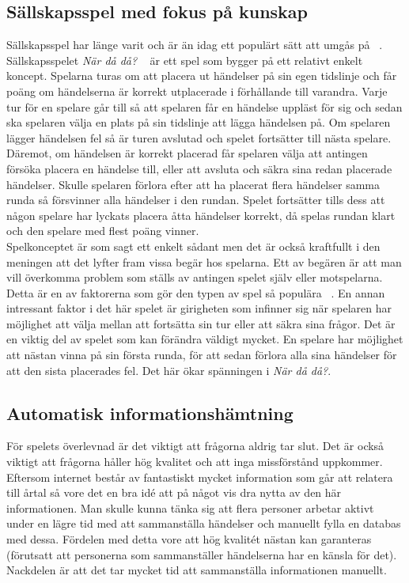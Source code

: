 \documentclass[a4paper, 11pt]{article}
\begin{document}
\subsection{Sällskapsspel med fokus på kunskap}
Sällskapsspel har länge varit och är än idag ett populärt sätt att umgås på ~\cite{bradspelspop}. Sällskapsspelet \textit{När då då?} ~\cite{nardada} är ett spel som bygger på ett relativt enkelt koncept. Spelarna turas om att placera ut händelser på sin egen tidslinje och får poäng om händelserna är korrekt utplacerade i förhållande till varandra. Varje tur för en spelare går till så att spelaren får en händelse uppläst för sig och sedan ska spelaren välja en plats på sin tidslinje att lägga händelsen på. Om spelaren lägger händelsen fel så är turen avslutad och spelet fortsätter till nästa spelare. Däremot, om händelsen är korrekt placerad får spelaren välja att antingen försöka placera en händelse till, eller att avsluta och säkra sina redan placerade händelser. Skulle spelaren förlora efter att ha placerat flera händelser samma runda så försvinner alla händelser i den rundan. Spelet fortsätter tills dess att någon spelare har lyckats placera åtta händelser korrekt, då spelas rundan klart och den spelare med flest poäng vinner.\\

Spelkonceptet är som sagt ett enkelt sådant men det är också kraftfullt i den meningen att det lyfter fram vissa begär hos spelarna. Ett av begären är att man vill överkomma problem som ställs av antingen spelet själv eller motspelarna. Detta är en av faktorerna som gör den typen av spel så populära ~\cite[sid 3--4]{psykologi}. En annan intressant faktor i det här spelet är girigheten som infinner sig när spelaren har möjlighet att välja mellan att fortsätta sin tur eller att säkra sina frågor. Det är en viktig del av spelet som kan förändra väldigt mycket. En spelare har möjlighet att nästan vinna på sin första runda, för att sedan förlora alla sina händelser för att den sista placerades fel. Det här ökar spänningen i \textit{När då då?}.

\subsection{Automatisk informationshämtning}
För spelets överlevnad är det viktigt att frågorna aldrig tar slut. Det är också viktigt att frågorna håller hög kvalitet och att inga missförstånd uppkommer. Eftersom internet består av fantastiskt mycket information som går att relatera till årtal så vore det en bra idé att på något vis dra nytta av den här informationen. Man skulle kunna tänka sig att flera personer arbetar aktivt under en lägre tid med att sammanställa händelser och manuellt fylla en databas med dessa. Fördelen med detta vore att hög kvalitét nästan kan garanteras (förutsatt att personerna som sammanställer händelserna har en känsla för det). Nackdelen är att det tar mycket tid att sammanställa informationen manuellt.
\end{document}

